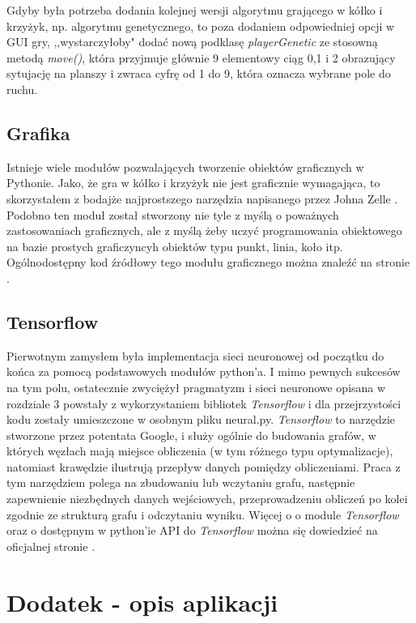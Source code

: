 \documentclass[licencjacka]{pracamgr}
\begin{document}
Gdyby była potrzeba dodania kolejnej wersji algorytmu grającego w kółko i krzyżyk, np. algorytmu genetycznego, to poza dodaniem odpowiedniej opcji w GUI gry, ,,wystarczyłoby" dodać nową podklasę \textit{playerGenetic} ze stosowną metodą \textit{move()}, która przyjmuje głównie 9 elementowy ciąg 0,1 i 2 obrazujący sytujację na planszy i zwraca cyfrę od 1 do 9, która oznacza wybrane pole do ruchu.  

\section{Grafika}
Istnieje wiele modułów pozwalających tworzenie obiektów graficznych w Pythonie. Jako, że gra w kółko i krzyżyk nie jest graficznie wymagająca, to skorzystałem z bodajże najprostszego narzędzia napisanego przez Johna Zelle \cite{Graphics}. Podobno ten moduł został stworzony nie tyle z myślą o poważnych zastosowaniach graficznych, ale z myślą żeby uczyć programowania obiektowego na bazie prostych graficzyncyh obiektów typu punkt, linia, koło itp.  Ogólnodostępny kod źródłowy tego modułu graficznego można znaleźć na stronie \cite{Graphics}.

\section{Tensorflow}
Pierwotnym zamysłem była implementacja  sieci neuronowej od początku do końca za pomocą podstawowych modułów python'a. I mimo pewnych sukcesów na tym polu, ostatecznie zwyciężył pragmatyzm i sieci neuronowe opisana w rozdziale 3 powstały z wykorzystaniem bibliotek \textit{Tensorflow} i dla przejrzystości kodu zostały umieszczone w osobnym pliku neural.py. \textit{Tensorflow} to narzędzie stworzone przez potentata Google, i służy ogólnie do budowania grafów, w których węzłach mają miejsce obliczenia (w tym różnego typu optymalizacje), natomiast krawędzie ilustrują przepływ danych pomiędzy obliczeniami. Praca z tym narzędziem polega na zbudowaniu lub wczytaniu grafu, następnie zapewnienie niezbędnych danych wejściowych, przeprowadzeniu obliczeń po kolei zgodnie ze strukturą grafu i odczytaniu wyniku.  Więcej o o module \textit{Tensorflow} oraz o dostępnym w python'ie API do  \textit{Tensorflow} można się dowiedzieć na oficjalnej stronie \cite{TF}. 


\chapter{Dodatek - opis aplikacji}
\end{document}
